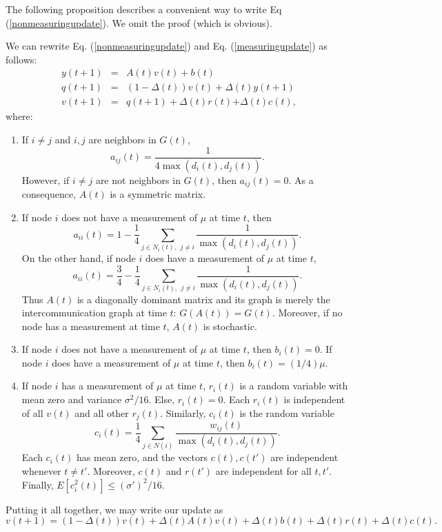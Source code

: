 \documentclass[final]{siamltex}
\begin{document}
The following proposition describes a convenient way to write Eq (\ref{nonmeasuringupdate}). We omit the proof (which is obvious). 

\smallskip

\begin{proposition} \label{remark:eqrewrite} We can rewrite Eq. (\ref{nonmeasuringupdate}) and Eq. (\ref{measuringupdate}) as follows:
\begin{eqnarray*} y(t+1) & = &  A(t) v(t) + b(t)  \\
q(t+1) & = & (1 - \Delta(t)) v(t) + \Delta(t) y(t+1) \\
v(t+1) & = & q(t+1) + \Delta(t) r(t){{{ + \Delta(t) c(t)}}},
\end{eqnarray*} where: 
\begin{enumerate}
\item If $i \neq j$ and $i,j$ are neighbors in $G(t)$, \[ a_{ij}(t) = \frac{1}{4 \max(d_i(t), d_j(t))}. \] {{{However, if $i \neq j$ are not neighbors in 
$G(t)$, then $a_{ij}(t)=0$.}}} As a consequence, 
$A(t)$ is a symmetric matrix. 
\item If node $i$ does not have a measurement of $\mu$ at time $t$, then \[ a_{ii}(t) = 1 - \frac{1}{4} \sum_{j \in N_i(t), ~~ j \neq i} 
\frac{1}{\max(d_i(t),d_j(t))}. \] On the other hand, if node $i$ does have a measurement of $\mu$ at time $t$, 
\[ a_{ii}(t) =  \frac{3}{4} - \frac{1}{4} \sum_{j \in N_i(t), ~~ j \neq i} 
\frac{1}{\max(d_i(t),d_j(t))} . \] Thus $A(t)$ is a diagonally dominant matrix and its graph is merely the 
intercommunication graph at time $t$: $G(A(t)) = G(t)$. Moreover, if no node has a measurement at time $t$, $A(t)$ is stochastic.
\item If node $i$ does not have a measurement of $\mu$ at time $t$, then $b_i(t)=0$. If node $i$ does have a measurement of $\mu$
at time $t$, then $b_i(t) = (1/4) \mu$. 
\item If node $i$ has a measurement of $\mu$ at time $t$, $r_i(t)$ is a random variable with mean zero and variance $\sigma^2/16$.  Else, 
$r_i(t)=0$. Each $r_i(t)$ is independent of all $v(t)$ {{{and all other $r_j(t)$. Similarly, $c_i(t)$ is the random variable \[ c_i(t) = \frac{1}{4} \sum_{j \in N(i)} \frac{w_{ij}(t)}{\max( d_i(t), d_j(t) )}. \] Each $c_i(t)$ has mean zero, and the vectors $c(t), c(t')$ are independent whenever $t \neq t'$. Moreover, $c(t)$ and $r(t')$ are 
independent for all $t,t'$. Finally, $E[c_i^2(t)] \leq (\sigma')^2/16$.}}} 
\end{enumerate} 

Putting it all together, we may write our update as 
\[ v(t+1) = (1- \Delta(t)) v(t)  + \Delta(t) A(t) v(t) + \Delta(t) b(t) + \Delta(t) r(t) + \Delta(t) c(t). \]
\end{proposition}
\end{document}

